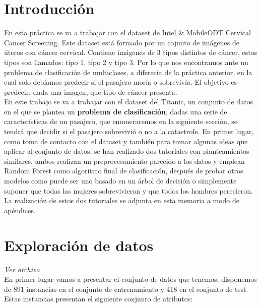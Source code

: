\section{Introducción}

En esta práctica se va a trabajar con el dataset de Intel & MobileODT Cervical Cancer Screening. Este dataset está formado por un cojunto de imágenes de úteros con cáncer cervical. Contiene imágenes de 3 tipos distintos de cáncer, estos tipos son llamados: tipo 1, tipo 2 y tipo 3. Por lo que nos encontramos ante un problema de clasificación de multiclases, a diferecia de la práctica anterior, en la cual solo debíamos predecir si el pasajero moría o sobrevivía. El objetivo es predecir, dada una imagen, que tipo de cáncer presenta.\\


En este trabajo se va a trabajar con el dataset del Titanic, un conjunto de datos en el que se plantea un \textbf{problema de clasificación}, dadas una serie de características de un pasajero, que enumeraremos en la siguiente sección, se tendrá que decidir si el pasajero sobrevivió o no a la catastrofe. En primer lugar, como toma de contacto con el dataset y también para tomar algunas ideas que aplicar al conjunto de datos, se han realizado dos tutoriales con planteamientos similares, ambos realizan un preprocesamiento parecido a los datos y emplean Random Forest como algoritmo final de clasificación, después de probar otros modelos como puede ser uno basado en un árbol de decisión o simplemente suponer que todas las mujeres sobrevivieron y que todos los hombres perecieron. La realización de estos dos tutoriales se adjunta en esta memoria a modo de apéndices.\\

\section{Exploración de datos} \emph{Ver archivo }\\

En primer lugar vamos a presentar el conjunto de datos que tenemos, disponemos de 891 instancias en el conjunto de entrenamiento y 418 en el conjunto de test. Estas instancias presentan el siguiente conjunto de atributos:

